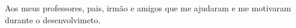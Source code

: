 \renewcommand{\dedicatorianame}{DEDICATÓRIA}

\begin{dedicatoria}
Aos meus professores, pais, irmão e amigos que me ajudaram e me 
motivaram durante o desenvolvimeto. 
\end{dedicatoria}
